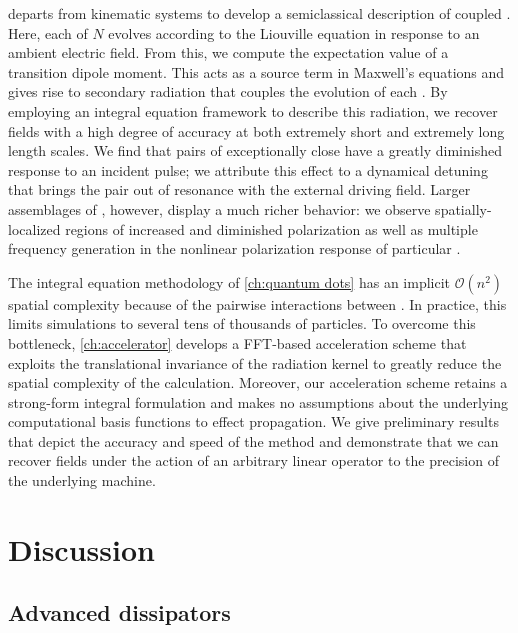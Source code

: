  departs from kinematic systems to develop a semiclassical description of coupled \qds{}.
Here, each of $N$ \qds{} evolves according to the Liouville equation in response to an ambient electric field.
From this, we compute the expectation value of a transition dipole moment.
This acts as a source term in Maxwell's equations and gives rise to secondary radiation that couples the evolution of each \qd{}.
By employing an integral equation framework to describe this radiation, we recover fields with a high degree of accuracy at both extremely short and extremely long length scales.
We find that pairs of exceptionally close \qds{} have a greatly diminished response to an incident pulse; we attribute this effect to a dynamical detuning that brings the pair out of resonance with the external driving field. 
Larger assemblages of \qds{}, however, display a much richer behavior: we observe spatially-localized regions of increased and diminished polarization as well as multiple frequency generation in the nonlinear polarization response of particular \qds{}.

The integral equation methodology of \cref{ch:quantum dots} has an implicit $\mathcal{O}(n^2)$ spatial complexity because of the pairwise interactions between \qds{}.
In practice, this limits simulations to several tens of thousands of particles.
To overcome this bottleneck, \cref{ch:accelerator} develops a FFT-based acceleration scheme that exploits the translational invariance of the radiation kernel to greatly reduce the spatial complexity of the calculation.
Moreover, our acceleration scheme retains a strong-form integral formulation and makes no assumptions about the underlying computational basis functions to effect propagation.
We give preliminary results that depict the accuracy and speed of the method and demonstrate that we can recover fields under the action of an arbitrary linear operator to the precision of the underlying machine.

\section{Discussion}

\subsection{Advanced dissipators}

